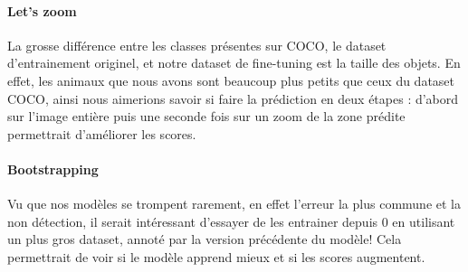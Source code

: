 \paragraph{Let's zoom} La grosse différence entre les classes présentes sur COCO, le dataset d'entrainement originel, et notre dataset de fine-tuning est la taille des objets. En effet, les animaux que nous avons sont beaucoup plus petits que ceux du dataset COCO, ainsi nous aimerions savoir si faire la prédiction en deux étapes : d'abord sur l'image entière puis une seconde fois sur un zoom de la zone prédite permettrait d'améliorer les scores.

\paragraph{Bootstrapping} Vu que nos modèles se trompent rarement, en effet l'erreur la plus commune et la non détection, il serait intéressant d'essayer de les entrainer depuis $0$ en utilisant un plus gros dataset, annoté par la version précédente du modèle! Cela permettrait de voir si le modèle apprend mieux et si les scores augmentent.